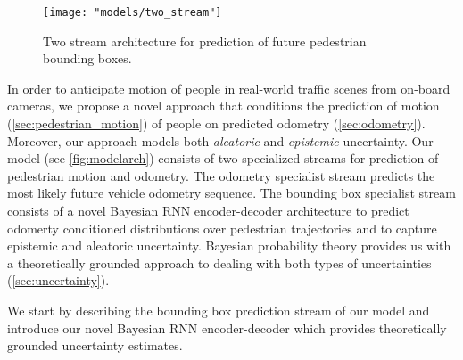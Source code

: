 \begin{figure*}[!t]
    \centering
    \begin{minipage}{0.6\textwidth}
        \centering
        \texttt{[image: "models/two\_stream"]}
    \end{minipage}
    \caption{Two stream architecture for prediction of future pedestrian bounding boxes.}
    \label{fig:modelarch}
\end{figure*}



In order to anticipate motion of people in real-world traffic scenes from on-board cameras, we propose a novel approach that conditions the  prediction of motion (\autoref{sec:pedestrian_motion}) of people on predicted odometry (\autoref{sec:odometry}). Moreover, our approach models both \emph{aleatoric} and \emph{epistemic} uncertainty. Our model (see \autoref{fig:modelarch}) consists of two specialized streams for prediction of pedestrian motion and odometry. The odometry specialist stream predicts the most likely future vehicle odometry sequence. The bounding box specialist stream consists of a novel Bayesian RNN encoder-decoder architecture to predict odomerty conditioned  distributions over pedestrian trajectories and to capture epistemic and aleatoric uncertainty. Bayesian probability theory provides us with a theoretically grounded approach to dealing with both types of uncertainties (\autoref{sec:uncertainty}). %
 
We start by describing the bounding box prediction stream of our model and introduce our novel Bayesian RNN encoder-decoder which provides theoretically grounded uncertainty estimates.

